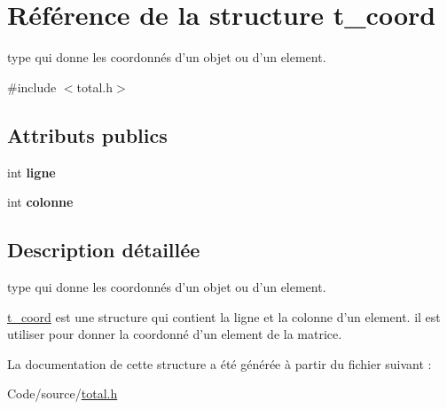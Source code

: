 \hypertarget{structt__coord}{\section{Référence de la structure t\-\_\-coord}
\label{structt__coord}
}


type qui donne les coordonnés d'un objet ou d'un element.  




{\ttfamily \#include $<$total.\-h$>$}

\subsection*{Attributs publics}
\begin{DoxyCompactItemize}
\item 
\hypertarget{structt__coord_a009f88610a7056e1252cab53887301da}{int {\bfseries ligne}}\label{structt__coord_a009f88610a7056e1252cab53887301da}

\item 
\hypertarget{structt__coord_a4f727b6e97b65d77281b4c119681ed59}{int {\bfseries colonne}}\label{structt__coord_a4f727b6e97b65d77281b4c119681ed59}

\end{DoxyCompactItemize}


\subsection{Description détaillée}
type qui donne les coordonnés d'un objet ou d'un element. 

\hyperlink{structt__coord}{t\-\_\-coord} est une structure qui contient la ligne et la colonne d'un element. il est utiliser pour donner la coordonné d'un element de la matrice. 

La documentation de cette structure a été générée à partir du fichier suivant \-:\begin{DoxyCompactItemize}
\item 
Code/source/\hyperlink{total_8h}{total.\-h}\end{DoxyCompactItemize}
